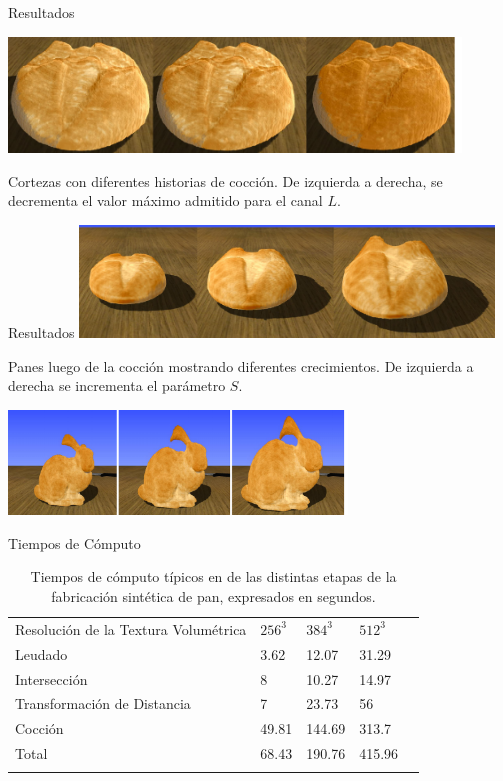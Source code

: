 \documentclass[spanish]{beamer}
\begin{document}
\begin{frame}{Resultados}

\centerline{\includegraphics[width=12cm]{../figures/Fig13}}
Cortezas con diferentes historias de cocción. De izquierda a derecha, se decrementa el valor máximo admitido para el canal $L$.

\end{frame}

\begin{frame}{Resultados}
\includegraphics[width=11cm]{../figures/Fig14}

Panes luego de la cocción mostrando diferentes crecimientos. De izquierda a derecha se incrementa el parámetro $S$.

\includegraphics[width=9cm]{../figures/Fig15}


\end{frame}

\begin{frame}{Tiempos de Cómputo}

\begin{table}[h!]
\begin{tabular}{lllll}
\hline\noalign{\smallskip}
Resolución de la Textura Volumétrica & $256^{3}$ & $384^{3}$  & $512^{3}$ \\
\noalign{\smallskip}\hline\noalign{\smallskip}
Leudado & 3.62 & 12.07 & 31.29 \\
Intersección & 8 & 10.27 & 14.97 \\
Transformación de Distancia & 7 & 23.73 & 56 \\
Cocción  & 49.81 & 144.69 & 313.7 \\
\hline\noalign{\smallskip}
Total & 68.43 & 190.76 & 415.96 \\
\noalign{\smallskip}\hline
\end{tabular}
\caption{Tiempos de cómputo típicos en de las distintas etapas de la fabricación sintética de pan, expresados en segundos.}
\label{tab:computingtimes}
\end{table}
\end{frame}
\end{document}
